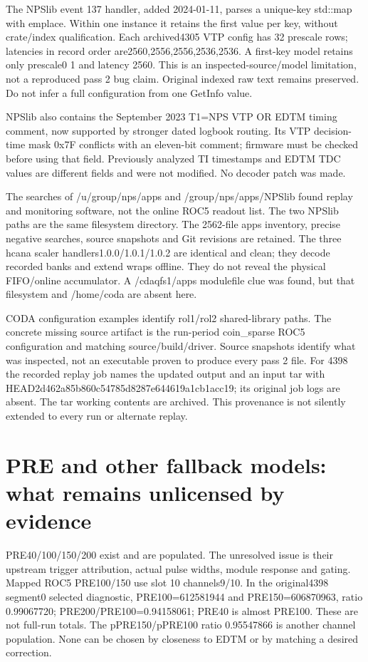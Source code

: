 The NPSlib event 137 handler, added 2024-01-11, parses a unique-key std::map with emplace. Within one instance it retains the first value per key, without crate/index qualification. Each archived4305 VTP config has 32 prescale rows; latencies in record order are2560,2556,2556,2536,2536. A first-key model retains only prescale0 1 and latency 2560. This is an inspected-source/model limitation, not a reproduced pass 2 bug claim. Original indexed raw text remains preserved. Do not infer a full configuration from one GetInfo value.


NPSlib also contains the September 2023 T1=NPS VTP OR EDTM timing comment, now supported by stronger dated logbook routing. Its VTP decision-time mask 0x7F conflicts with an eleven-bit comment; firmware must be checked before using that field. Previously analyzed TI timestamps and EDTM TDC values are different fields and were not modified. No decoder patch was made.


The searches of /u/group/nps/apps and /group/nps/apps/NPSlib found replay and monitoring software, not the online ROC5 readout list. The two NPSlib paths are the same filesystem directory. The 2562-file apps inventory, precise negative searches, source snapshots and Git revisions are retained. The three hcana scaler handlers1.0.0/1.0.1/1.0.2 are identical and clean; they decode recorded banks and extend wraps offline. They do not reveal the physical FIFO/online accumulator. A /cdaqfs1/apps modulefile clue was found, but that filesystem and /home/coda are absent here.


CODA configuration examples identify rol1/rol2 shared-library paths. The concrete missing source artifact is the run-period coin\_sparse ROC5 configuration and matching source/build/driver. Source snapshots identify what was inspected, not an executable proven to produce every pass 2 file. For 4398 the recorded replay job names the updated output and an input tar with HEAD2d462a85b860c54785d8287e644619a1cb1acc19; its original job logs are absent. The tar working contents are archived. This provenance is not silently extended to every run or alternate replay.


\section{PRE and other fallback models: what remains unlicensed by evidence}
PRE40/100/150/200 exist and are populated. The unresolved issue is their upstream trigger attribution, actual pulse widths, module response and gating. Mapped ROC5 PRE100/150 use slot 10 channels9/10. In the original4398 segment0 selected diagnostic, PRE100=612581944 and PRE150=606870963, ratio 0.99067720; PRE200/PRE100=0.94158061; PRE40 is almost PRE100. These are not full-run totals. The pPRE150/pPRE100 ratio 0.95547866 is another channel population. None can be chosen by closeness to EDTM or by matching a desired correction.


